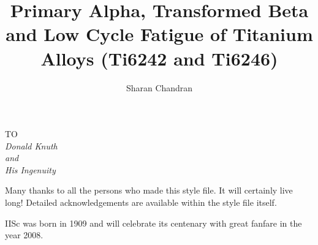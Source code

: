 \documentclass[12pt]{iiscthes} %
\begin{document}
\begin{frontmatter}

\title{Primary Alpha, Transformed Beta and Low Cycle Fatigue of Titanium Alloys (Ti6242 and Ti6246)\\
	}
\author{Sharan Chandran}
\enggfaculty
\iisclogotrue %
\tablespagetrue %
\maketitle


\begin{dedication}
\begin{center}
TO \\[2em]
\large\it Donald Knuth\\
and\\
\large\it His Ingenuity 
\end{center}
\end{dedication}
\acknowledgements

Many thanks to all the persons who made this style file. It will certainly
live long! Detailed acknowledgements are available within the style file itself.

\vita
IISc was born in 1909 and will celebrate its centenary with great fanfare
in the year 2008.
\publications


\end{frontmatter}
\end{document}
